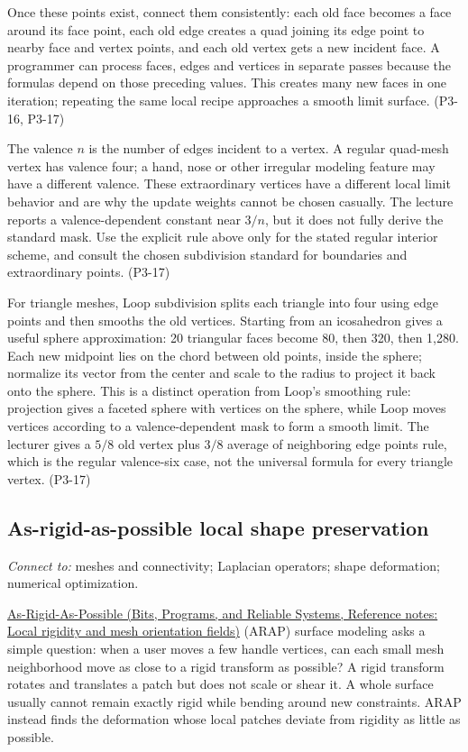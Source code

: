 Once these points exist, connect them consistently: each old face becomes a face around its face point, each old edge creates a quad joining its edge point to nearby face and vertex points, and each old vertex gets a new incident face. A programmer can process faces, edges and vertices in separate passes because the formulas depend on those preceding values. This creates many new faces in one iteration; repeating the same local recipe approaches a smooth limit surface. (P3-16, P3-17)

The valence \(n\) is the number of edges incident to a vertex. A regular quad-mesh vertex has valence four; a hand, nose or other irregular modeling feature may have a different valence. These extraordinary vertices have a different local limit behavior and are why the update weights cannot be chosen casually. The lecture reports a valence-dependent constant near \(3/n\), but it does not fully derive the standard mask. Use the explicit rule above only for the stated regular interior scheme, and consult the chosen subdivision standard for boundaries and extraordinary points. (P3-17)

For triangle meshes, Loop subdivision splits each triangle into four using edge points and then smooths the old vertices. Starting from an icosahedron gives a useful sphere approximation: 20 triangular faces become 80, then 320, then 1,280. Each new midpoint lies on the chord between old points, inside the sphere; normalize its vector from the center and scale to the radius to project it back onto the sphere. This is a distinct operation from Loop's smoothing rule: projection gives a faceted sphere with vertices on the sphere, while Loop moves vertices according to a valence-dependent mask to form a smooth limit. The lecturer gives a \(5/8\) old vertex plus \(3/8\) average of neighboring edge points rule, which is the regular valence-six case, not the universal formula for every triangle vertex. (P3-17)

\subsection{As-rigid-as-possible local shape preservation}\label{03-visual-computing-i-ch002-as-rigid-as-possible-local-shape-preservation}

\emph{Connect to:} meshes and connectivity; Laplacian operators; shape deformation; numerical optimization.

\href{../01-Bits-Programs-and-Reliable-Systems/main.pdf\#nameddest=appendix-7107009c505b}{As-Rigid-As-Possible (Bits, Programs, and Reliable Systems, Reference notes: Local rigidity and mesh orientation fields)} (ARAP) surface modeling asks a simple question: when a user moves a few handle vertices, can each small mesh neighborhood move as close to a rigid transform as possible? A rigid transform rotates and translates a patch but does not scale or shear it. A whole surface usually cannot remain exactly rigid while bending around new constraints. ARAP instead finds the deformation whose local patches deviate from rigidity as little as possible.


